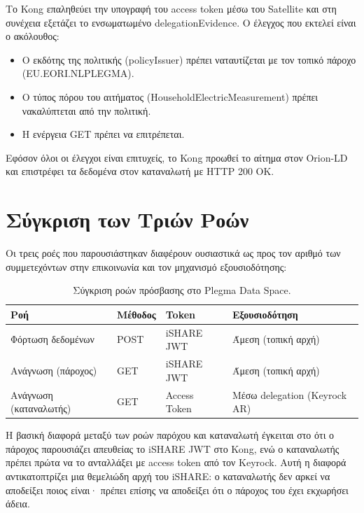 Το \textlatin{Kong} επαληθεύει την υπογραφή του \textlatin{access token} μέσω
του \textlatin{Satellite} και στη συνέχεια εξετάζει το ενσωματωμένο
\textlatin{delegationEvidence}. Ο έλεγχος που εκτελεί είναι ο ακόλουθος:

\begin{itemize}
    \item Ο εκδότης της πολιτικής (\textlatin{policyIssuer}) πρέπει ναταυτίζεται με τον
    τοπικό πάροχο (\textlatin{EU.EORI.NLPLEGMA}).
    \item Ο τύπος πόρου του αιτήματος
    (\textlatin{HouseholdElectricMeasurement}) πρέπει νακαλύπτεται από την πολιτική.
    \item Η ενέργεια \textlatin{GET} πρέπει να επιτρέπεται.
\end{itemize}

Εφόσον όλοι οι έλεγχοι είναι επιτυχείς, το \textlatin{Kong} προωθεί το
αίτημα στον \textlatin{Orion-LD} και επιστρέφει τα δεδομένα στον καταναλωτή
με \textlatin{HTTP 200 OK}.

\section{Σύγκριση των Τριών Ροών}
\label{sec:flows-comparison}

Οι τρεις ροές που παρουσιάστηκαν διαφέρουν ουσιαστικά ως προς τον αριθμό
των συμμετεχόντων στην επικοινωνία και τον μηχανισμό εξουσιοδότησης:

\begin{table}[H]
\centering
\caption{Σύγκριση ροών πρόσβασης στο \textlatin{Plegma Data Space}.}
\label{tab:flows-comparison}
\begin{tabular}{|>{\centering\arraybackslash}m{3.5cm}|>{\centering\arraybackslash}m{3cm}|>{\centering\arraybackslash}m{3cm}|>{\centering\arraybackslash}m{4cm}|}
\hline
\textbf{Ροή} & \textbf{Μέθοδος} & \textbf{Token} & \textbf{Εξουσιοδότηση} \\
\hline
Φόρτωση δεδομένων & \textlatin{POST} & \textlatin{iSHARE JWT} & Άμεση (τοπική αρχή) \\
\hline
Ανάγνωση (πάροχος) & \textlatin{GET} & \textlatin{iSHARE JWT} & Άμεση (τοπική αρχή) \\
\hline
Ανάγνωση (καταναλωτής) & \textlatin{GET} & \textlatin{Access Token} & Μέσω \textlatin{delegation} (\textlatin{Keyrock AR}) \\
\hline
\end{tabular}
\end{table}

Η βασική διαφορά μεταξύ των ροών παρόχου και καταναλωτή έγκειται στο ότι
ο πάροχος παρουσιάζει απευθείας το \textlatin{iSHARE JWT} στο \textlatin{Kong},
ενώ ο καταναλωτής πρέπει πρώτα να το ανταλλάξει με \textlatin{access token}
από τον \textlatin{Keyrock}. Αυτή η διαφορά αντικατοπτρίζει μια θεμελιώδη
αρχή του \textlatin{iSHARE}: ο καταναλωτής δεν αρκεί να αποδείξει ποιος
είναι· πρέπει επίσης να αποδείξει ότι ο πάροχος του έχει εκχωρήσει άδεια.

